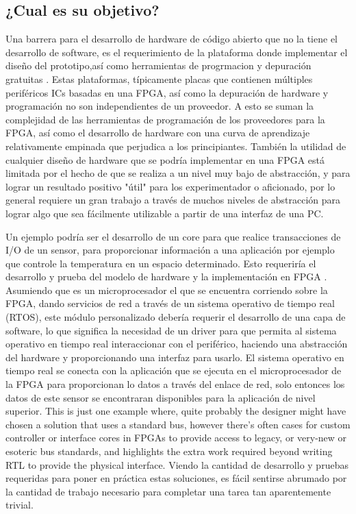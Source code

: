 	\subsection{¿Cual es su objetivo? }


Una barrera para el desarrollo de hardware de código abierto que no la tiene el desarrollo de software, es el requerimiento de la plataforma donde implementar el diseño del prototipo,así como herramientas  de progrmacion y depuración gratuitas . Estas plataformas, típicamente placas que contienen múltiples periféricos ICs basadas en una FPGA, así como la depuración de hardware y programación no son independientes de un proveedor. A esto se suman la complejidad de las herramientas de programación de los proveedores para la FPGA, así como el desarrollo de hardware con una curva de aprendizaje relativamente empinada que perjudica a los principiantes.
También  la utilidad de cualquier diseño de hardware que se podría implementar en una FPGA está limitada por el hecho de que se realiza a un nivel muy bajo de abstracción, y para lograr un resultado positivo "útil" para los experimentador o aficionado, por lo general requiere un gran trabajo a través de muchos niveles de abstracción para lograr algo que sea fácilmente utilizable a partir de una interfaz de una PC. 

Un ejemplo podría ser el desarrollo de un core para que realice transacciones de I/O de un sensor, para proporcionar información a una aplicación por ejemplo que controle la temperatura en un espacio determinado. Esto requeriría el desarrollo y prueba del modelo de hardware y la implementación en FPGA . Asumiendo que es un microprocesador el que se encuentra corriendo sobre la FPGA, dando servicios de red a través de un sistema operativo de tiempo real (RTOS), este módulo personalizado debería requerir el desarrollo de una capa de software, lo que significa la necesidad de un driver para que permita al sistema operativo en tiempo real interaccionar con el periférico, haciendo una abstracción del hardware y proporcionando una interfaz para usarlo. El sistema operativo en tiempo real se conecta con la aplicación que se ejecuta en el microprocesador de la FPGA para proporcionan lo datos a través del enlace de red, solo entonces los datos de este sensor se encontraran disponibles para la aplicación de nivel superior. This is just one example where, quite probably the designer might have chosen a solution that uses a standard bus, however there’s often cases for custom controller or interface cores in FPGAs to provide
access to legacy, or very-new or esoteric bus standards, and highlights the extra work required beyond writing RTL to provide the physical interface.
Viendo la cantidad de desarrollo y pruebas requeridas para poner en práctica estas soluciones, es fácil sentirse abrumado por la cantidad de trabajo necesario para completar una tarea tan aparentemente trivial.

